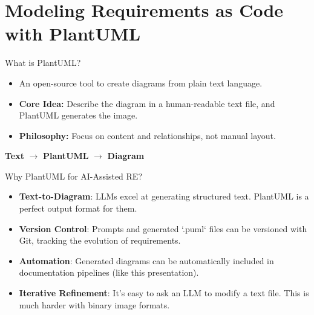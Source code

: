 \documentclass{beamer}
\begin{document}
\section{Modeling Requirements as Code with PlantUML}

\begin{frame}[t]{What is PlantUML?}
    \begin{itemize}
        \item An open-source tool to create diagrams from plain text language.
        \item \textbf{Core Idea:} Describe the diagram in a human-readable text file, and PlantUML generates the image.
        \item \textbf{Philosophy:} Focus on content and relationships, not manual layout.
    \end{itemize}
    \begin{center}
    \textbf{Text} $\rightarrow$ \textbf{PlantUML} $\rightarrow$ \textbf{Diagram}
    \end{center}
\end{frame}

\begin{frame}[t]{Why PlantUML for AI-Assisted RE?}
    \begin{itemize}
        \item \textbf{Text-to-Diagram}: LLMs excel at generating structured text. PlantUML is a perfect output format for them.
        \item \textbf{Version Control}: Prompts and generated `.puml` files can be versioned with Git, tracking the evolution of requirements.
        \item \textbf{Automation}: Generated diagrams can be automatically included in documentation pipelines (like this presentation).
        \item \textbf{Iterative Refinement}: It's easy to ask an LLM to modify a text file. This is much harder with binary image formats.
    \end{itemize}
\end{frame}
\end{document}
